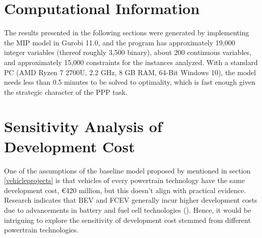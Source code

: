 \section{Computational Information}\label{sec: computational information}
The results presented in the following sections were generated by implementing the \gls{MIP} model in Gurobi 11.0, and the program has approximately 19,000 integer variables (thereof roughly 3,500 binary), about 200 continuous variables, and approximately 15,000 constraints for the instances analyzed. With a standard PC (AMD Ryzen 7 2700U, 2.2 GHz, 8 GB RAM, 64-Bit Windows 10), the model needs less than 0.5 minutes to be solved to optimality, which is fast enough given the strategic character of the \gls{PPP} task.\\
\section{Sensitivity Analysis of Development Cost}\label{section:Experiment 1}
One of the assumptions of the baseline model proposed by \cite{mainreference_thies} mentioned in section \ref{vehicleprojects} is that vehicles of every powertrain technology have the same development cost, \euro{420} million, but this doesn't align with practical evidence. Research indicates that \gls{BEV} and \gls{FCEV} generally incur higher development costs due to advancements in battery and fuel cell technologies (\cite{konig2021overview, wolfram2016electric}). Hence, it would be intriguing to explore the sensitivity of development cost stemmed from different powertrain technologies.
